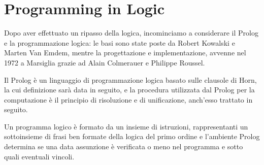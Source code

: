 \documentclass[a4paper]{book}
\begin{document}
\chapter{Programming in Logic}
Dopo aver effettuato un ripasso della logica, incominciamo a considerare il Prolog e la programmazione logica:
le basi sono state poste da Robert Kowalski e Marten Van Emdem, mentre la progettazione e implementazione,
avvenne nel 1972 a Marsiglia grazie ad Alain Colmerauer e Philippe Roussel.

Il Prolog è un linguaggio di programmazione logica basato sulle clausole di Horn, la cui definizione sarà data in seguito,
e la procedura utilizzata dal Prolog per la computazione è il principio di risoluzione e di unificazione, anch'esso trattato in seguito.

Un programma logico è formato da un insieme di istruzioni, rappresentanti un sottoinsieme di frasi ben formate della logica del primo ordine
e l'ambiente Prolog determina se una data assunzione è verificata o meno nel programma e sotto quali eventuali vincoli.
\end{document}
